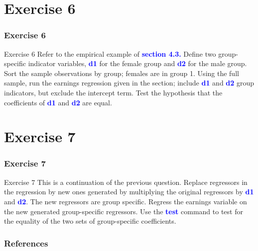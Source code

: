 \documentclass[11pt, aspectratio=169]{beamer}
\begin{document}
	\section{Exercise 6}
		\begin{frame}
			\frametitle{Exercise 6}
			\begin{block}{Exercise 6}
				Refer to the empirical example of \textcolor{blue}{\textbf{section 4.3.}} Define two group-specific
				indicator variables, \textcolor{blue}{\textbf{d1}} for the female group and \textcolor{blue}{\textbf{d2}} for the
				male group. Sort the sample observations by group; females are in group 1. 
				Using the full sample, run the earnings regression given in the section; include \textcolor{blue}{\textbf{d1}} and \textcolor{blue}{\textbf{d2}} group indicators, but exclude the intercept
				term. Test the hypothesis that the coefficients of \textcolor{blue}{\textbf{d1}} and \textcolor{blue}{\textbf{d2}} are equal.
			\end{block}
		\end{frame}
	\section{Exercise 7}
		\begin{frame}
			\frametitle{Exercise 7}
			\begin{block}{Exercise 7}
				This is a continuation of the previous question. Replace regressors in
				the regression by new ones generated by multiplying the original
				regressors by \textcolor{blue}{\textbf{d1}} and \textcolor{blue}{\textbf{d2}}. 
				The new regressors are group specific.
				Regress the earnings variable on the new generated group-specific
				regressors. Use the \textcolor{blue}{\textbf{test}} command to test for the equality of the two
				sets of group-specific coefficients.
			\end{block}
		\end{frame}
	\begin{frame}[t,allowframebreaks]
		\frametitle{References}
		
		
		\nocite{cameron2022-I}
		\nocite{cameron2022-II}
	\end{frame}
	\begin{frame}
		\maketitle
	\end{frame}
\end{document}
